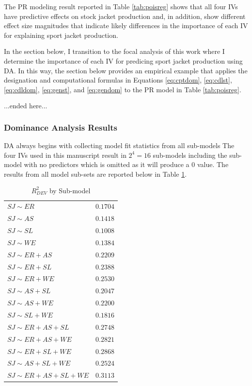 \documentclass[ShortAfour,times,sageapa]{sagej}
\begin{document}
	The PR modeling result reported in Table \ref{tab:poisreg} shows that all four IVs have predictive effects on stock jacket production and, in addition, show different effect size magnitudes that indicate likely differences in the importance of each IV for explaining sport jacket production.
	
	In the section below, I transition to the focal analysis of this work where I determine the importance of each IV for predicing sport jacket production using DA.
	In this way, the section below provides an empirical example that applies the designation and computational formulas in Equations \ref{eq:cptdom}, \ref{eq:cdlst}, \ref{eq:cdldom}, \ref{eq:genst}, and \ref{eq:gendom} to the PR model in Table \ref{tab:poisreg}.
	
	...ended here...
	
		\subsubsection{Dominance Analysis Results}
		
	DA always begins with collecting model fit statistics from all sub-models 
	The four IVs used in this manuscript result in $2^4 = 16$ sub-models including the sub-model with no predictors which is omitted as it will produce a 0 value.
	The results from all model sub-sets are reported below in Table \ref{tab:r2sub}.
	
	\begin{table}[h!]
		\centering
		\caption{\centering $R^2_{DEV}$ by Sub-model}
		\begin{tabular}{l|r}
			\toprule
			$SJ \sim ER$ & $0.1704$ \\ 
			$SJ \sim AS$ & $0.1418$ \\ 
			$SJ \sim SL$ & $0.1008$ \\ 
			$SJ \sim WE$ & $0.1384$ \\ 
			$SJ \sim ER + AS$ & $0.2209$ \\ 
			$SJ \sim ER + SL$ & $0.2388$ \\ 
			$SJ \sim ER + WE$ & $0.2530$ \\ 
			$SJ \sim AS + SL$ & $0.2047$ \\ 
			$SJ \sim AS + WE$ & $0.2200$ \\ 
			$SJ \sim SL + WE$ & $0.1816$ \\ 
			$SJ \sim ER + AS + SL$ & $0.2748$\\ 
			$SJ \sim ER + AS + WE$ & $0.2821$ \\ 
			$SJ \sim ER + SL + WE$ & $0.2868$ \\ 
			$SJ \sim AS + SL + WE$ & $0.2524$ \\ 
			$SJ \sim ER + AS + SL + WE$ & $0.3113$ \\ 
			\bottomrule
		\end{tabular}
		\label{tab:r2sub}
	\end{table}
\end{document}
